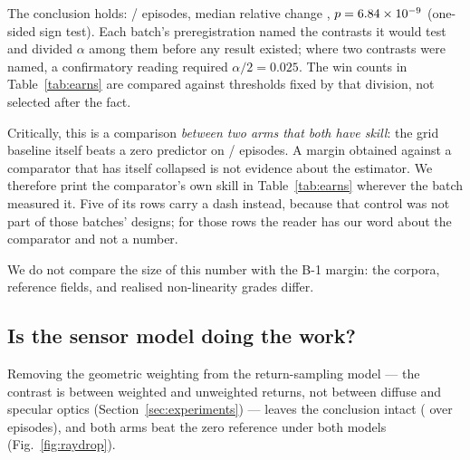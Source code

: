 \documentclass[review]{elsarticle}
\begin{document}
The conclusion holds: \BTwelveBetter{}/\BTwelveN{} episodes, median relative change
\BTwelveRel{}, $p = 6.84\times 10^{-9}{}$ (one-sided sign test).
Each batch's preregistration named the contrasts it would test and divided
$\alpha$ among them before any result existed; where two contrasts were named, a
confirmatory reading required $\alpha/2 = 0.025$. The win counts in
Table~\ref{tab:earns} are compared against thresholds fixed by that division, not
selected after the fact.

Critically, this is a comparison \emph{between two arms that both have skill}: the
grid baseline itself beats a zero predictor on \BTwelveCmpBetter{}/\BTwelveCmpN{}
episodes. A margin obtained against a comparator that has itself collapsed is not
evidence about the estimator. We therefore print the comparator's own skill in
Table~\ref{tab:earns} wherever the batch measured it. Five of its rows carry a dash
instead, because that control was not part of those batches' designs; for those rows
the reader has our word about the comparator and not a number.

We do not compare the size of this number with the B-1 margin: the corpora, reference
fields, and realised non-linearity grades differ.

\subsection{Is the sensor model doing the work?}
\label{sec:res_sensor}

Removing the geometric weighting from the return-sampling model --- the contrast is
between weighted and unweighted returns, not between diffuse and specular optics
(Section~\ref{sec:experiments}) --- leaves the conclusion intact
(\BFifteenRel{} over \BFifteenN{} episodes), and both arms beat the zero reference
under both models (Fig.~\ref{fig:raydrop}).
\end{document}
